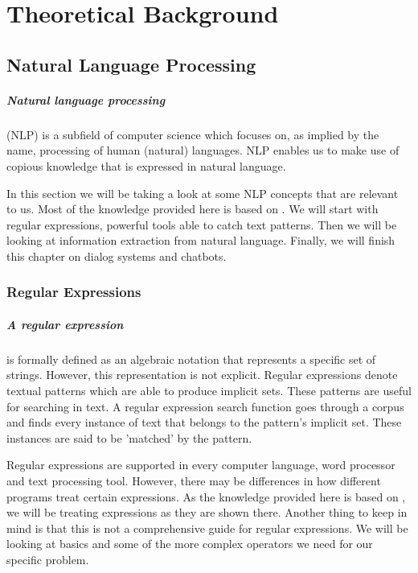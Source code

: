 
\chapter{Theoretical Background}\label{chapter:theoretical_background}

\section{Natural Language Processing}
\paragraph{Natural language processing }(NLP) is a subfield of computer science which focuses on, as implied by the name, processing of human (natural) languages. NLP enables us to make use of copious knowledge that is expressed in natural language. \parencite{ai_nlp} 


In this section we will be taking a look at some NLP concepts that are relevant to us. 
Most of the knowledge provided here is based on \parencite{nlp}.
We will start with regular expressions, powerful tools able to catch text patterns. 
Then we will be looking at information extraction from natural language. 
Finally, we will finish this chapter on dialog systems and chatbots.

\subsection{Regular Expressions}
\paragraph{A regular expression}is formally defined as an algebraic notation that represents a specific set of strings.
However, this representation is not explicit. 
Regular expressions denote textual patterns which are able to produce implicit sets.
These patterns are useful for searching in text.
A regular expression search function goes through a corpus and finds every instance of text that belongs to the pattern's implicit set.
These instances are said to be 'matched' by the pattern.

Regular expressions are supported in every computer language, word processor and text processing tool. 
However, there may be differences in how different programs treat certain expressions. 
As the knowledge provided here is based on \parencite{nlp_re}, we will be treating expressions as they are shown there.
Another thing to keep in mind is that this is not a comprehensive guide for regular expressions. 
We will be looking at basics and some of the more complex operators we need for our specific problem. 

